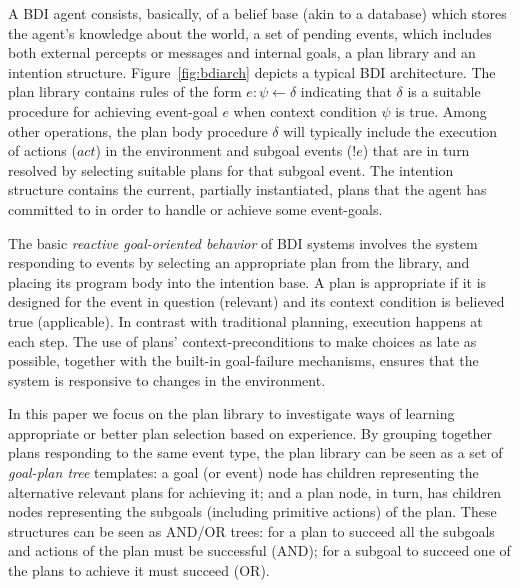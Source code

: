 A BDI agent consists, basically, of a belief base (akin to a
database) which stores the agent's knowledge about the world, a set of
pending events, which includes both external percepts or messages and
internal goals, a plan library and an intention structure.
Figure~\ref{fig:bdiarch} depicts a typical BDI architecture.
The plan library contains rules of the form $e: \psi \leftarrow
\delta$ indicating that $\delta$ is a suitable procedure for achieving
event-goal $e$ when context condition $\psi$ is true.
Among other operations, the plan body procedure $\delta$ will
typically include the 
execution of actions ($act$) in the environment and subgoal events ($!e$) that
are in turn resolved by selecting suitable plans for that subgoal
event.
%
The intention structure contains the current, partially instantiated,
plans that the agent has committed to in order to handle or
achieve some event-goals.

The basic \emph{reactive goal-oriented behavior} of BDI systems involves the
system responding to events by 
selecting an appropriate plan from the library, and placing its
program body into the intention base.
A plan is appropriate if it is designed for the event in question
(relevant) and its context
condition is believed true (applicable).
In contrast with traditional planning, execution happens at each step. The
use of plans' context-preconditions to make choices as
late as possible, together with the built-in goal-failure mechanisms, ensures
that the system is responsive to changes in the environment.

In this paper we focus on the plan library to
investigate ways of learning appropriate or better plan selection
based on experience. 
By grouping together plans responding to the same
event type, the plan library can be seen as a set of \emph{goal-plan tree}
templates: a goal (or event) node has children representing the alternative
relevant plans for achieving it; and a plan node, in turn, has children nodes
representing the subgoals (including primitive actions) of the plan.
These structures can be seen as AND/OR trees: for a plan to succeed all the
subgoals and actions of the plan must be successful (AND); for a subgoal to
succeed one of the plans to achieve it must succeed (OR).

